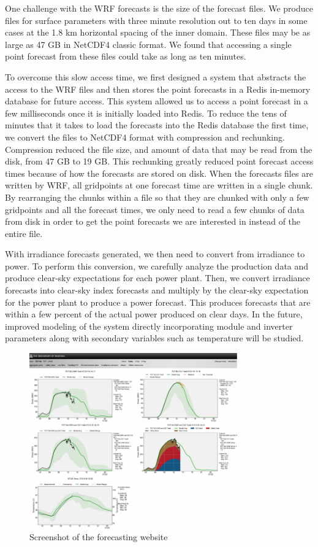 One challenge with the WRF forecasts is the size of the forecast
files.
We produce files for surface parameters with three minute resolution
out to ten days in some cases at the 1.8 km horizontal spacing of the
inner domain.
These files may be as large as 47 GB in NetCDF4 classic format.
We found that accessing a single point forecast from these files could
take as long as ten minutes.

To overcome this slow access time, we first designed a system that
abstracts the access to the WRF files and then stores the point
forecasts in a Redis in-memory database for future access.
This system allowed us to access a point forecast in a few
milliseconds once it is initially loaded into Redis.
To reduce the tens of minutes that it takes to load the forecasts into
the Redis database the first time, we convert the files to NetCDF4
format with compression and rechunking.
Compression reduced the file size, and amount of data that may be read
from the disk, from 47 GB to 19 GB.
This rechunking greatly reduced point forecast access times because of
how the forecasts are stored on disk.
When the forecasts files are written by WRF, all gridpoints at one
forecast time are written in a single chunk.
By rearranging the chunks within a file so that they are chunked with
only a few gridpoints and all the forecast times, we
only need to read a few chunks of data from disk in order to get the
point forecasts we are interested in instead of the entire file.

With irradiance forecasts generated, we then need to convert from
irradiance to power.
To perform this conversion, we carefully analyze the
production data and produce clear-sky expectations for each power
plant.
Then, we convert irradiance forecasts into clear-sky index forecasts
and multiply by the clear-sky expectation for the power plant to
produce a power forecast.
This produces forecasts that are within a few percent of the actual
power produced on clear days.
In the future, improved modeling of the system directly incorporating
module and inverter parameters along with secondary variables such as
temperature will be studied.

\begin{figure}[htb]
\centering
\includegraphics[width=0.8\textwidth]{figs/web_example.pdf}
\caption{Screenshot of the forecasting website}
\label{fig:website}
\end{figure}

